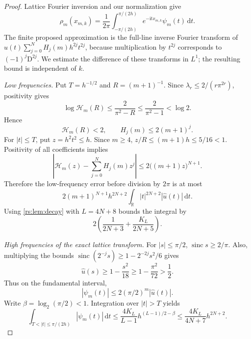 \documentclass[11pt,a4paper,oneside,openany]{book}
\numberwithin{equation}{chapter}
\theoremstyle{definition}
\theoremstyle{remark}
\newcommand{\R}{\mathbb R}
\newcommand{\dd}{\,\mathrm d}
\newcommand{\ii}{\mathrm i}
\DeclareMathOperator{\sinc}{sinc}
\newcommand{\D}{\mathrm D}
\begin{document}
\begin{proof}
Lattice Fourier inversion and our normalization give
\begin{equation}
 \rho_m(x_{m,k})=\frac1{2\pi}
 \int_{-\pi/(2h)}^{\pi/(2h)}e^{-\ii t x_{m,k}}\psi_m(t)\dd t.
 \label{rs:eq:lattice-inversion}
\end{equation}
The finite proposed approximation is the full-line inverse Fourier
transform of
$\widehat u(t)\sum_{j=0}^NH_j(m)h^{2j}t^{2j}$, because multiplication by
$t^{2j}$ corresponds to $(-1)^j\D^{2j}$.
We estimate the difference of these transforms in $L^1$; the resulting
bound is independent of $k$.

\emph{Low frequencies.}
Put $T=h^{-1/2}$ and $R=(m+1)^{-1}$. Since
$\lambda_r\leq2/(r\pi^{2r})$, positivity gives
\begin{equation}
 \log\mathcal H_m(R)
 \leq\frac2{\pi^2-R}\leq\frac2{\pi^2-1}<\log2.
\end{equation}
Hence
\begin{equation}
 \mathcal H_m(R)<2,
 \qquad H_j(m)\leq2(m+1)^j.
 \label{rs:eq:H-coeff-bound}
\end{equation}
For $|t|\leq T$, put $z=h^2t^2\leq h$. Since $m\geq4$,
$z/R\leq(m+1)h\leq5/16<1$. Positivity of all coefficients implies
\begin{equation}
 \left|\mathcal H_m(z)-\sum_{j=0}^NH_j(m)z^j\right|
 \leq2\bigl((m+1)z\bigr)^{N+1}.
 \label{rs:eq:H-remainder}
\end{equation}
Therefore the low-frequency error before division by $2\pi$ is at most
\begin{equation}
 2(m+1)^{N+1}h^{2N+2}
       \int_{\R}|t|^{2N+2}|\widehat u(t)|\dd t.
 \label{rs:eq:low-error}
\end{equation}
Using \cref{rs:lem:decay} with $L=4N+8$ bounds the integral by
\begin{equation}
 2\left(\frac1{2N+3}+\frac{K_L}{2N+5}\right).
 \label{rs:eq:weighted-integral-bound}
\end{equation}

\emph{High frequencies of the exact lattice transform.}
For $|s|\leq\pi/2$, $\sinc s\geq2/\pi$. Also, multiplying the
bounds $\sinc(2^{-j}s)\geq1-2^{-2j}s^2/6$ gives
\begin{equation}
 \widehat u(s)\geq1-\frac{s^2}{18}\geq1-\frac{\pi^2}{72}>\frac12.
\end{equation}
Thus on the fundamental interval,
\begin{equation}
 |\psi_m(t)|\leq2(\pi/2)^m|\widehat u(t)|.
\end{equation}
Write $\beta=\log_2(\pi/2)<1$. Integration over $|t|>T$ yields
\begin{equation}
 \int_{T<|t|\leq\pi/(2h)}|\psi_m(t)|\dd t
 \leq\frac{4K_L}{L-1}h^{(L-1)/2-\beta}
 \leq\frac{4K_L}{4N+7}h^{2N+2}.
 \label{rs:eq:psi-tail-bound}
\end{equation}


\end{proof}
\end{document}
